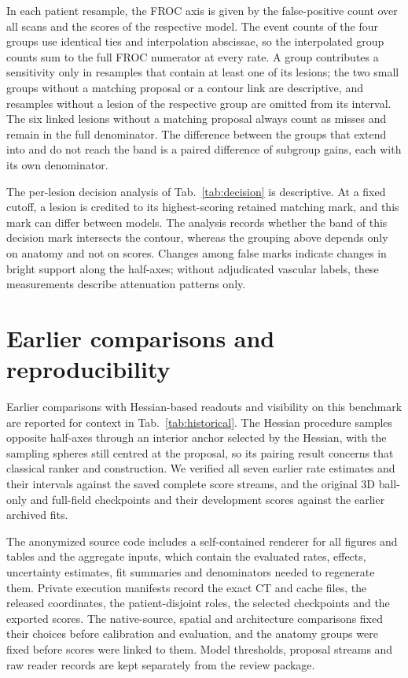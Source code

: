 In each patient resample, the FROC axis is given by the false-positive count over all scans and the scores of the respective model. The event counts of the four groups use identical ties and interpolation abscissae, so the interpolated group counts sum to the full FROC numerator at every rate. A group contributes a sensitivity only in resamples that contain at least one of its lesions; the two small groups without a matching proposal or a contour link are descriptive, and resamples without a lesion of the respective group are omitted from its interval. The six linked lesions without a matching proposal always count as misses and remain in the full denominator. The difference between the groups that extend into and do not reach the band is a paired difference of subgroup gains, each with its own denominator.

The per-lesion decision analysis of Tab.~\ref{tab:decision} is descriptive. At a fixed cutoff, a lesion is credited to its highest-scoring retained matching mark, and this mark can differ between models. The analysis records whether the band of this decision mark intersects the contour, whereas the grouping above depends only on anatomy and not on scores. Changes among false marks indicate changes in bright support along the half-axes; without adjudicated vascular labels, these measurements describe attenuation patterns only.

\section{Earlier comparisons and reproducibility}
\label{supp:repro}

Earlier comparisons with Hessian-based readouts and visibility on this benchmark are reported for context in Tab.~\ref{tab:historical}. The Hessian procedure samples opposite half-axes through an interior anchor selected by the Hessian, with the sampling spheres still centred at the proposal, so its pairing result concerns that classical ranker and construction. We verified all seven earlier rate estimates and their intervals against the saved complete score streams, and the original 3D ball-only and full-field checkpoints and their development scores against the earlier archived fits.

The anonymized source code includes a self-contained renderer for all figures and tables and the aggregate inputs, which contain the evaluated rates, effects, uncertainty estimates, fit summaries and denominators needed to regenerate them. Private execution manifests record the exact CT and cache files, the released coordinates, the patient-disjoint roles, the selected checkpoints and the exported scores. The native-source, spatial and architecture comparisons fixed their choices before calibration and evaluation, and the anatomy groups were fixed before scores were linked to them. Model thresholds, proposal streams and raw reader records are kept separately from the review package.

